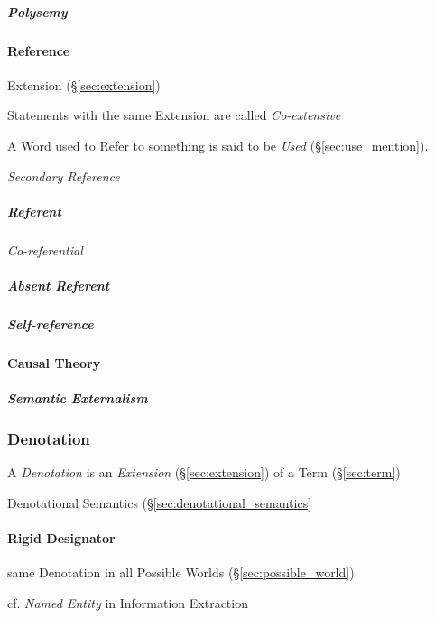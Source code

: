 \subparagraph{Polysemy}\label{sec:polysemy}\hfill



\paragraph{Reference}\label{sec:reference}\hfill

Extension (\S\ref{sec:extension})

Statements with the same Extension are called \emph{Co-extensive}

A Word used to Refer to something is said to be \emph{Used}
(\S\ref{sec:use_mention}).

\emph{Secondary Reference}

\subparagraph{Referent}\label{sec:referent}\hfill

\emph{Co-referential}

\subparagraph{Absent Referent}\label{sec:absent_referent}\hfill

\subparagraph{Self-reference}\label{sec:self_reference}\hfill



\paragraph{Causal Theory}\label{sec:causal_reference}\hfill

\subparagraph{Semantic Externalism}\label{sec:semantic_externalism}\hfill



\subsubsection{Denotation}\label{sec:denotation}

A \emph{Denotation} is an \emph{Extension} (\S\ref{sec:extension}) of
a Term (\S\ref{sec:term})

Denotational Semantics (\S\ref{sec:denotational_semantics}



\paragraph{Rigid Designator}\label{sec:rigid_designator}\hfill

same Denotation in all Possible Worlds (\S\ref{sec:possible_world})

cf. \emph{Named Entity} in Information Extraction



